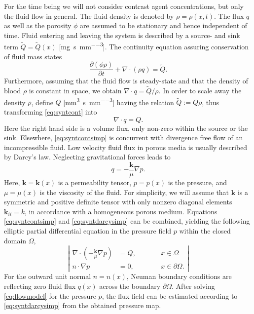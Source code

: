 \documentclass[journal,twocolumn]{IEEEtran}
\newcommand{\siQmm}{\milli\meter\cubed\per\second\per\milli\meter\cubed}
\newcommand{\siQtilde}{\milli\gram\per\second\per\milli\meter\cubed}
\begin{document}
	For the time being we will not consider contrast agent concentrations, but only the fluid flow in general.
	The fluid density is denoted by $\rho = \rho(x,t)$. 
	The flux $q$ as well as the porosity $\phi$ are assumed to be stationary and hence independent of time.
	Fluid entering and leaving the system is described by a source- and sink term $\tilde{Q} = \tilde{Q}(x)$ [\si{\siQtilde}]. 
	The continuity equation assuring conservation of fluid mass states
	\begin{equation}
		\frac{\partial (\phi \rho)}{\partial t} + \nabla \cdot (\rho q) = \tilde{Q}.
		\label{eq:syntcont}
	\end{equation} 
	Furthermore, assuming that the fluid flow is steady-state and that the density of blood $\rho$ is constant in space, we obtain $\nabla \cdot q = \tilde{Q}/\rho$.
	In order to scale away the density $\rho$, define $Q$ [\si{\siQmm}] having the relation $\tilde{Q} := Q\rho$, thus transforming \eqref{eq:syntcont} into 
	\begin{equation}
		\nabla \cdot q = Q.
		\label{eq:syntcontsimp}
	\end{equation}
	Here the right hand side is a volume flux, only non-zero within the source or the sink. 
	Elsewhere, \eqref{eq:syntcontsimp} is concurrent with divergence free flow of an incompressible fluid.
	Low velocity fluid flux in porous media is usually described by Darcy's law. 	Neglecting gravitational forces leads to \cite{Darcy56}
	\begin{equation}
		q = -\frac{\mathbf{k}}{\mu} \nabla p.
		\label{eq:syntdarcysimp}
	\end{equation}
	Here, $\mathbf{k} = \mathbf{k}(x)$ is a permeability tensor, $p=p(x)$ is the pressure, and $\mu = \mu(x)$ is the viscosity of the fluid. 	
	For simplicity, we will assume that $\mathbf{k}$ is a symmetric and positive definite tensor with only nonzero diagonal elements $\mathbf{k}_{ii} = k$, in accordance with a homogeneous porous medium.	
	Equations \eqref{eq:syntcontsimp} and \eqref{eq:syntdarcysimp} can be combined, yielding the following elliptic partial differential equation in the pressure field $p$ within the closed domain $\Omega$,
	\begin{equation}
		\left\vert
		\begin{alignedat}{2}
			\nabla \cdot \left( -\frac{\mathbf{k}}{\mu} \nabla p \right) &= Q,  \qquad &&x \in \Omega \\
			n \cdot \nabla p &=0, &&x \in \partial \Omega.
		\end{alignedat}
		\right\vert 
		\label{eq:flowmodel}
	\end{equation}
	For the outward unit normal $n=n(x)$, Neuman boundary conditions are reflecting zero fluid flux $q(x)$ across the boundary $\partial \Omega$.
	After solving \eqref{eq:flowmodel} for the pressure $p$, the flux field can be estimated according to \eqref{eq:syntdarcysimp} from the obtained pressure map. 
	
\end{document}
